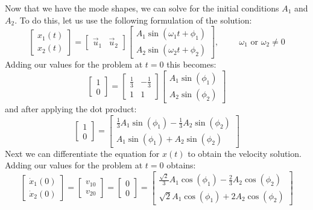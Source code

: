 \documentclass[12pt,letter]{article}
\begin{document}
\begin{example}
	Now that we have the mode shapes, we can solve for the initial conditions $A_1$ and $A_2$. To do this, let us use the following formulation of the solution:
	\begin{equation}
		 \begin{bmatrix} x_1(t) \\  x_2(t) \end{bmatrix} =  \begin{bmatrix} \vec{u}_1 & \vec{u}_2 \end{bmatrix}
		 \begin{bmatrix} A_1 \sin (\omega_1 t + \phi_1 )\\ A_2 \sin (\omega_2 t + \phi_2 )\end{bmatrix}, \hspace{1cm} \omega_1 \text{ or } \omega_2 \neq 0
	\end{equation}
	Adding our values for the problem at $t=0$ this becomes:
	\begin{equation}
		 \begin{bmatrix} 1 \\  0 \end{bmatrix} =  \begin{bmatrix} \frac{1}{3} & -\frac{1}{3} \\ 1 & 1 \end{bmatrix}
		 \begin{bmatrix} A_1 \sin (\phi_1)\\ A_2 \sin (\phi_2)\end{bmatrix}
	\end{equation}
	and after applying the dot product:
	\begin{equation}
		 \begin{bmatrix} 1 \\  0 \end{bmatrix} =  \begin{bmatrix} \frac{1}{3}A_1 \sin (\phi_1 ) -\frac{1}{3}A_2 \sin (\phi_2)\\ A_1 \sin (\phi_1 )+A_2 \sin (\phi_2 )\end{bmatrix}
	\end{equation}
	Next we can differentiate the equation for $x(t)$ to obtain the velocity solution. Adding our values for the problem at $t=0$ obtains:
	\begin{equation}
		 \begin{bmatrix} \dot{x}_1(0) \\  \dot{x}_2(0) \end{bmatrix}  = \begin{bmatrix} v_{10} \\  v_{20} \end{bmatrix} = \begin{bmatrix} 0 \\  0 \end{bmatrix} =   \begin{bmatrix} \frac{\sqrt{2}}{3}A_1 \cos (\phi_1 ) -\frac{2}{3}A_2 \cos (\phi_2)\\ \sqrt{2}A_1 \cos (\phi_1 )+2 A_2 \cos (\phi_2 )\end{bmatrix}

\end{equation}
\end{example}
\end{document}
